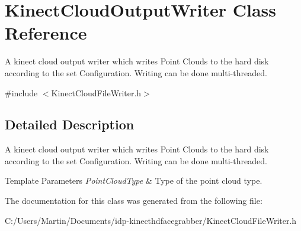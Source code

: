\hypertarget{class_kinect_cloud_output_writer}{}\section{Kinect\+Cloud\+Output\+Writer Class Reference}
\label{class_kinect_cloud_output_writer}


A kinect cloud output writer which writes Point Clouds to the hard disk according to the set Configuration. Writing can be done multi-\/threaded.  




{\ttfamily \#include $<$Kinect\+Cloud\+File\+Writer.\+h$>$}



\subsection{Detailed Description}
A kinect cloud output writer which writes Point Clouds to the hard disk according to the set Configuration. Writing can be done multi-\/threaded. 


\begin{DoxyTemplParams}{Template Parameters}
{\em Point\+Cloud\+Type} & Type of the point cloud type. \\
\hline
\end{DoxyTemplParams}


The documentation for this class was generated from the following file\+:\begin{DoxyCompactItemize}
\item 
C\+:/\+Users/\+Martin/\+Documents/idp-\/kinecthdfacegrabber/Kinect\+Cloud\+File\+Writer.\+h\end{DoxyCompactItemize}
